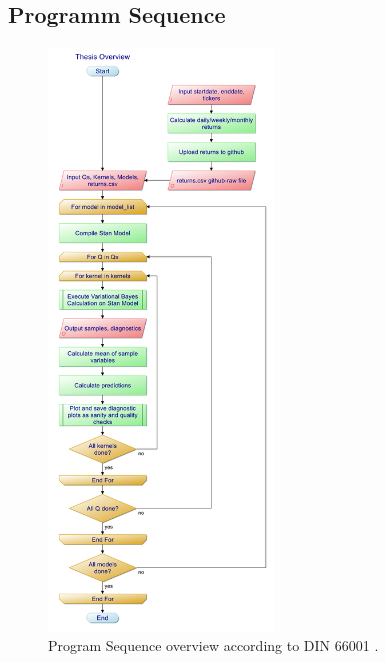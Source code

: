 \subsection{Programm Sequence}
\begin{figure}%
	\label{fig:program_sequence}
	\centering
	\includegraphics[width=60mm]{img/06_1/ThesisOverview.png}
	\caption[Overview of the program sequence.]
	{Program Sequence overview according to DIN 66001 \cite{DIN66001}.}
\end{figure}
